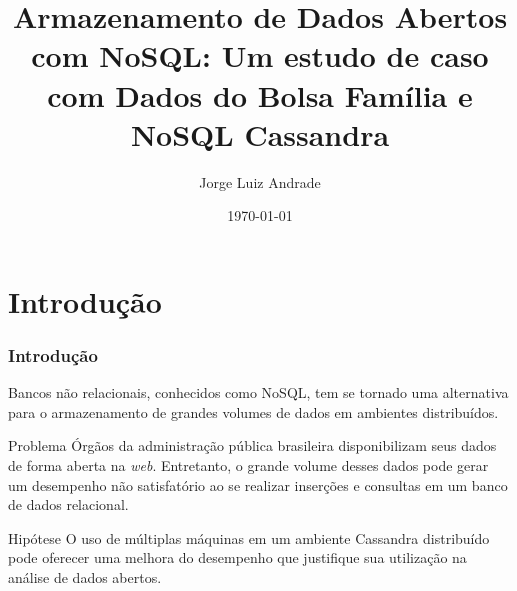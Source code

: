 \documentclass[brazil]{beamer}
\title[Bolsa Família e Cassandra]{Armazenamento de Dados Abertos com NoSQL: Um estudo de caso com Dados do Bolsa Família e NoSQL Cassandra} %
\author{Jorge Luiz Andrade} %
\institute[UnB] %
{
Defesa de Trabalho de Conclusão de Curso \\
\medskip
Universidade de Brasília \\ %
}
\date{\today} %
\begin{document}
\begin{frame}
\titlepage %
\end{frame}

\tableofcontents %


\section{Introdução} 

\begin{frame}
\frametitle{Introdução}	
	
Bancos não relacionais, conhecidos como NoSQL, tem se tornado uma alternativa para o armazenamento de grandes volumes de dados em ambientes distribuídos.
	
\begin{block}{Problema}
	Órgãos da administração pública brasileira disponibilizam seus dados de forma aberta na \emph{web}. Entretanto, o grande volume desses dados pode gerar um desempenho não satisfatório ao se realizar inserções e consultas em um banco de dados relacional.
\end{block}

\begin{block}{Hipótese}
	O uso de múltiplas máquinas em um ambiente Cassandra distribuído pode oferecer uma melhora do desempenho que justifique sua utilização na análise de dados abertos.	
\end{block}

\end{frame}
\end{document}
